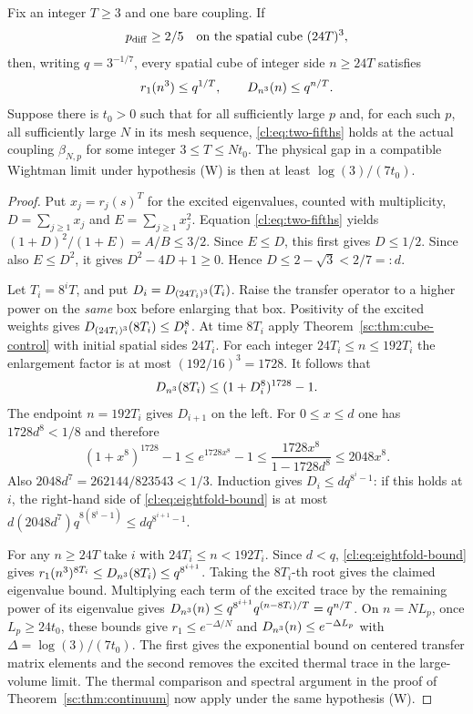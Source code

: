\begin{theorem}\label{cl:thm:seam-disagreement}
Fix an integer $T\ge3$ and one bare coupling. If
\begin{equation}\label{cl:eq:two-fifths}
 p_{\rm diff}\ge 2/5 \quad\hbox{on the spatial cube } (24T)^3,
\end{equation}
then, writing $q=3^{-1/7}$, every spatial cube of integer side $n\ge24T$
satisfies
\[
 r_1(n^3)\le q^{1/T},\qquad
 D_{n^3}(n)\le q^{n/T}.
\]
Suppose there is $t_0>0$ such that for all sufficiently large $p$ and,
for each such $p$, all sufficiently large $N$ in its mesh sequence,
\eqref{cl:eq:two-fifths} holds at the actual coupling $\beta_{N,p}$ for
some integer $3\le T\le Nt_0$. The physical gap in a compatible Wightman
limit under hypothesis \textup{(W)} is then at least $\log(3)/(7t_0)$.
\end{theorem}
\begin{proof}
Put $x_j=r_j(s)^T$ for the excited eigenvalues, counted with multiplicity,
$D=\sum_{j\ge1}x_j$ and $E=\sum_{j\ge1}x_j^2$. Equation
\eqref{cl:eq:two-fifths} yields $(1+D)^2/(1+E)=A/B\le3/2$.
Since $E\le D$, this first gives $D\le1/2$. Since also $E\le D^2$,
it gives $D^2-4D+1\ge0$. Hence $D\le2-\sqrt3<2/7=:d$.

Let $T_i=8^iT$, and put $D_i=D_{(24T_i)^3}(T_i)$.
Raise the transfer operator to a higher power on the \emph{same} box
before enlarging that box. Positivity of the excited weights gives
$D_{(24T_i)^3}(8T_i)\le D_i^8$. At time $8T_i$ apply
Theorem~\ref{sc:thm:cube-control} with initial spatial sides $24T_i$.
For each integer $24T_i\le n\le192T_i$ the enlargement factor is at
most $(192/16)^3=1728$. It follows that
\begin{equation}\label{cl:eq:eightfold-bound}
 D_{n^3}(8T_i)\le(1+D_i^8)^{1728}-1.
\end{equation}
The endpoint $n=192T_i$ gives $D_{i+1}$ on the left.
For $0\le x\le d$ one has $1728d^8<1/8$ and therefore
\[
 (1+x^8)^{1728}-1
 \le e^{1728x^8}-1
 \le \frac{1728x^8}{1-1728d^8}\le2048x^8 .
\]
Also $2048d^7=262144/823543<1/3$. Induction gives
$D_i\le d q^{8^i-1}$: if this holds at $i$, the right-hand side of
\eqref{cl:eq:eightfold-bound} is at most
$d(2048d^7)q^{8(8^i-1)}\le d q^{8^{i+1}-1}$.

For any $n\ge24T$ take $i$ with $24T_i\le n<192T_i$. Since $d<q$,
\eqref{cl:eq:eightfold-bound} gives
$r_1(n^3)^{8T_i}\le D_{n^3}(8T_i)\le q^{8^{i+1}}$.
Taking the $8T_i$-th root gives the claimed eigenvalue bound. Multiplying
each term of the excited trace by the remaining power of its eigenvalue
gives $D_{n^3}(n)\le q^{8^{i+1}}q^{(n-8T_i)/T}=q^{n/T}$.
On $n=NL_p$, once $L_p\ge24t_0$, these bounds give
$r_1\le e^{-\Delta/N}$ and $D_{n^3}(n)\le e^{-\Delta L_p}$ with
$\Delta=\log(3)/(7t_0)$. The first gives the exponential bound on
centered transfer matrix elements and the second removes the excited
thermal trace in the large-volume limit. The thermal comparison and
spectral argument in the proof of Theorem~\ref{sc:thm:continuum}
now apply under the same hypothesis \textup{(W)}.
\end{proof}

